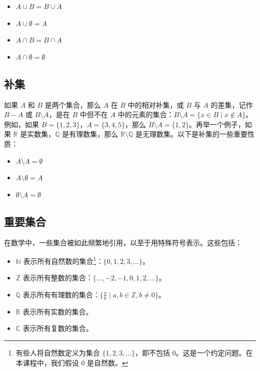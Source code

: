 \documentclass[11pt]{article}
\begin{document}
\begin{itemize}
\item $A \cup B = B \cup A$
\item $A \cup \emptyset = A$
\item $A \cap B = B \cap A$
\item $A \cap \emptyset = \emptyset$
\end{itemize}

\subsection*{补集}

如果 $A$ 和 $B$ 是两个集合，那么 $A$ 在 $B$ 中的相对补集，或 $B$ 与 $A$ 的差集，记作 $B - A$ 或 $B \setminus A$，是在 $B$ 中但不在 $A$ 中的元素的集合：$B \setminus A = \{x \in B \mid x \notin A\}$。例如，如果 $B = \{1, 2, 3\}$，$A = \{3, 4, 5\}$，那么 $B \setminus A = \{1, 2\}$。再举一个例子，如果 $\mathbb{R}$ 是实数集，$\mathbb{Q}$ 是有理数集，那么 $\mathbb{R} \setminus \mathbb{Q}$ 是无理数集。以下是补集的一些重要性质：

\begin{itemize}
\item $A \setminus A = \emptyset$
\item $A \setminus \emptyset = A$
\item $\emptyset \setminus A = \emptyset$
\end{itemize}

\subsection*{重要集合}

在数学中，一些集合被如此频繁地引用，以至于用特殊符号表示。这些包括：

\begin{itemize}
\item $\mathbb{N}$ 表示所有自然数的集合\footnote{有些人将自然数定义为集合 $\{1, 2, 3, \ldots\}$，即不包括 0。这是一个约定问题。在本课程中，我们假设 0 是自然数。}：$\{0, 1, 2, 3, \ldots\}$。
\item $\mathbb{Z}$ 表示所有整数的集合：$\{\ldots, -2, -1, 0, 1, 2, \ldots\}$。
\item $\mathbb{Q}$ 表示所有有理数的集合：$\{\frac{a}{b} \mid a, b \in \mathbb{Z}, b \neq 0\}$。
\item $\mathbb{R}$ 表示所有实数的集合。
\item $\mathbb{C}$ 表示所有复数的集合。
\end{itemize}
\end{document}
